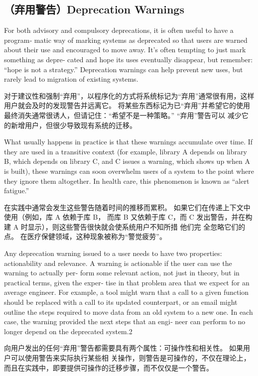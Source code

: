 \documentclass[10pt,a4paper,UTF8]{ctexart}
\begin{document}
\subsection{（弃用警告）Deprecation Warnings}
\label{sec:org3fed270}

For both advisory and compulsory deprecations, it is often useful to have a program‐ matic way of
marking systems as deprecated so that users are warned about their use and encouraged to move away.
It’s often tempting to just mark something as depre‐ cated and hope its uses eventually disappear,
but remember: “hope is not a strategy.” Deprecation warnings can help prevent new uses, but rarely
lead to migration of existing systems.

对于建议性和强制“弃用”，以程序化的方式将系统标记为“弃用”通常很有用，这样用户就会及时的发现警告并远离它。
将某些东西标记为已“弃用”并希望它的使用最终消失通常很诱人，但请记住：“希望不是一种策略。” “弃用”警告可以
减少它的新增用户，但很少导致现有系统的迁移。

What usually happens in practice is that these warnings accumulate over time. If they are used in a
transitive context (for example, library A depends on library B, which depends on library C, and C
issues a warning, which shows up when A is built), these warnings can soon overwhelm users of a
system to the point where they ignore them altogether. In health care, this phenomenon is known as
“alert fatigue.”

在实践中通常会发生这些警告随着时间的推移而累积。 如果它们在传递上下文中使用（例如，库 A 依赖于库 B，
而库 B 又依赖于库 C，而 C 发出警告，并在构建 A 时显示），则这些警告很快就会使系统用户不知所措 他们完
全忽略它们的点。 在医疗保健领域，这种现象被称为“警觉疲劳”。

Any deprecation warning issued to a user needs to have two properties: actionability and relevance.
A warning is actionable if the user can use the warning to actually per‐ form some relevant action,
not just in theory, but in practical terms, given the exper‐ tise in that problem area that we
expect for an average engineer. For example, a tool might warn that a call to a given function
should be replaced with a call to its updated counterpart, or an email might outline the steps
required to move data from an old system to a new one. In each case, the warning provided the next
steps that an engi‐ neer can perform to no longer depend on the deprecated system.2

向用户发出的任何“弃用”警告都需要具有两个属性：可操作性和相关性。 如果用户可以使用警告来实际执行某些相
关操作，则警告是可操作的，不仅在理论上，而且在实践中，即要提供可操作的迁移步骤，而不仅仅是一个警告。
\end{document}
